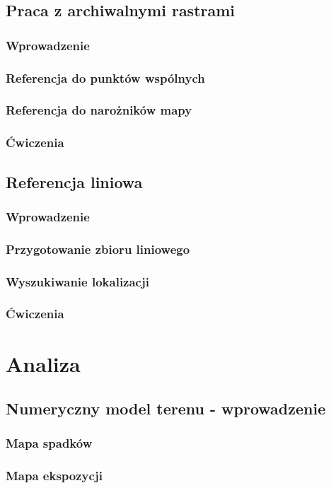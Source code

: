 \documentclass[a4paper,11pt, onecolumn, openany]{memoir}
\begin{document}
	\chapter{Praca z archiwalnymi rastrami}
		\section{Wprowadzenie}
		\section{Referencja do punktów wspólnych}
		\section{Referencja do narożników mapy}
		\section{Ćwiczenia}

	\chapter{Referencja liniowa}
		\section{Wprowadzenie}
		\section{Przygotowanie zbioru liniowego}
		\section{Wyszukiwanie lokalizacji}
		\section{Ćwiczenia}

\part{Analiza}
	\chapter{Numeryczny model terenu - wprowadzenie}
		\section{Mapa spadków}
		\section{Mapa ekspozycji}
\end{document}
